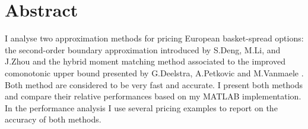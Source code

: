 \documentclass[a4paper]{article}
\begin{document}
\section*{Abstract}
I analyse two approximation methods for pricing European basket-spread options: the second-order boundary approximation introduced by S.Deng, M.Li, and J.Zhou \cite{sob} and the hybrid moment matching method associated to the improved comonotonic upper bound presented by G.Deelstra, A.Petkovic and M.Vanmaele \cite{hybmmicub}. Both method are considered to be very fast and accurate. I present both methods and compare their relative performances based on my MATLAB implementation. In the performance analysis I use several pricing examples to report on the accuracy of both methods. 

\newpage

\renewcommand{\cftsecleader}{\cftdotfill{\cftdotsep}}
\tableofcontents

\newpage
{}
\setcounter{page}{1}
\end{document}
